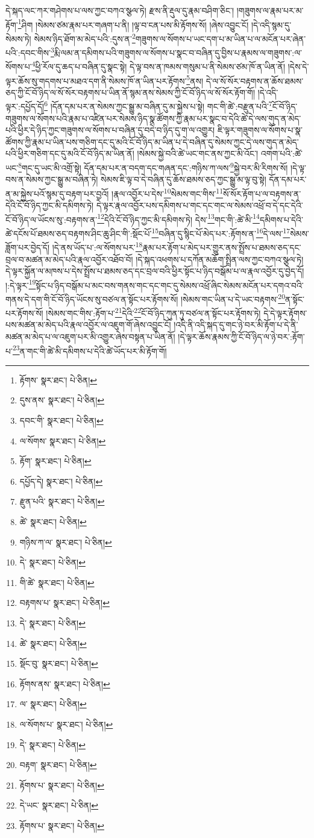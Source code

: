 དེ་སྐད་ལང་ཀར་གཤེགས་པ་ལས་ཀྱང་བཀའ་སྩལ་ཏེ། རྫས་ནི་རྡུལ་དུ་རྣམ་བཤིག་ཅིང་། །གཟུགས་ལ་རྣམ་པར་མ་རྟོག་\footnote{རྟོགས་  སྣར་ཐང་།  པེ་ཅིན། }ཤིག །སེམས་ཙམ་རྣམ་པར་གཞག་པ་ནི། །ལྟ་བ་ངན་པས་མི་རྟོགས་སོ། །ཞེས་འབྱུང་ངོ། །དེ་འདི་སྙམ་དུ་སེམས་ཏེ། སེམས་ཉིད་ཐོག་མ་མེད་པའི་:དུས་ན་\footnote{དུས་ནས་  སྣར་ཐང་།  པེ་ཅིན། }གཟུགས་ལ་སོགས་པ་ཡང་དག་པ་མ་ཡིན་པ་ལ་མངོན་པར་ཞེན་པའི་:དབང་གིས་\footnote{དབང་གི་  སྣར་ཐང་།  པེ་ཅིན། }རྨི་ལམ་ན་དམིགས་པའི་གཟུགས་ལ་སོགས་པ་སྣང་བ་བཞིན་དུ་བྱིས་པ་རྣམས་ལ་གཟུགས་:ལ་སོགས་པ་\footnote{ལ་སོགས་  སྣར་ཐང་།  པེ་ཅིན། }ཕྱི་རོལ་དུ་ཆད་པ་བཞིན་དུ་སྣང་སྟེ། དེ་ལྟ་བས་ན་ཁམས་གསུམ་པ་ནི་སེམས་ཙམ་ཁོ་ན་ཡིན་ནོ། །དེས་དེ་ལྟར་ཆོས་སུ་གདགས་པ་མཐའ་དག་ནི་སེམས་ཁོ་ན་ཡིན་པར་རྟོགས་\footnote{རྟོག་  སྣར་ཐང་།  པེ་ཅིན། }ནས། དེ་ལ་སོ་སོར་བརྟགས་ན་ཆོས་ཐམས་ཅད་ཀྱི་ངོ་བོ་ཉིད་ལ་སོ་སོར་བརྟགས་པ་ཡིན་ནོ་སྙམ་ནས་སེམས་ཀྱི་ངོ་བོ་ཉིད་ལ་སོ་སོར་རྟོག་གོ། །དེ་འདི་ལྟར་:དཔྱོད་དོ།\footnote{དཔྱོད་དེ།  སྣར་ཐང་།  པེ་ཅིན། } །དོན་དམ་པར་ན་སེམས་ཀྱང་སྒྱུ་མ་བཞིན་དུ་མ་སྐྱེས་པ་སྟེ། གང་གི་ཚེ་:བརྫུན་པའི་\footnote{རྫུན་པའི་  སྣར་ཐང་།  པེ་ཅིན། }ངོ་བོ་ཉིད་གཟུགས་ལ་སོགས་པའི་རྣམ་པ་འཛིན་པར་སེམས་ཉིད་སྣ་ཚོགས་ཀྱི་རྣམ་པར་སྣང་བ་དེའི་ཚེ་དེ་ལས་གུད་ན་མེད་པའི་ཕྱིར་དེ་ཉིད་ཀྱང་གཟུགས་ལ་སོགས་པ་བཞིན་དུ་བདེ་བ་ཉིད་དུ་ག་ལ་འགྱུར། ཇི་ལྟར་གཟུགས་ལ་སོགས་པ་སྣ་ཚོགས་ཀྱི་རྣམ་པ་ཡིན་པས་གཅིག་དང་དུ་མའི་ངོ་བོ་ཉིད་མ་ཡིན་པ་དེ་བཞིན་དུ་སེམས་ཀྱང་དེ་ལས་གུད་ན་མེད་པའི་ཕྱིར་གཅིག་དང་དུ་མའི་ངོ་བོ་ཉིད་མ་ཡིན་ནོ། །སེམས་སྐྱེ་བའི་ཚེ་ཡང་གང་ནས་ཀྱང་མི་འོང་། འགག་པའི་:ཚེ་ཡང་\footnote{ཚེ་  སྣར་ཐང་།  པེ་ཅིན། }གང་དུ་ཡང་མི་འགྲོ་སྟེ། དོན་དམ་པར་ན་བདག་དང་གཞན་དང་:གཉིས་ཀ་ལས་\footnote{གཉིས་ཀ་ལ་  སྣར་ཐང་།  པེ་ཅིན། }སྐྱེ་བར་མི་རིགས་སོ། །དེ་ལྟ་བས་ན་སེམས་ཀྱང་སྒྱུ་མ་བཞིན་ཏེ། སེམས་ཇི་ལྟ་བ་དེ་བཞིན་དུ་ཆོས་ཐམས་ཅད་ཀྱང་སྒྱུ་མ་ལྟ་བུ་སྟེ། དོན་དམ་པར་ན་མ་སྐྱེས་པའོ་སྙམ་དུ་བརྟག་པར་བྱའོ། །རྣལ་འབྱོར་པ་དེས་\footnote{དེ་  སྣར་ཐང་།  པེ་ཅིན། }སེམས་གང་གིས་\footnote{གི་ཚེ་  སྣར་ཐང་།  པེ་ཅིན། }སོ་སོར་རྟོག་པ་ལ་བརྟགས་ན་དེའི་ངོ་བོ་ཉིད་ཀྱང་མི་དམིགས་ཏེ། དེ་ལྟར་རྣལ་འབྱོར་པས་དམིགས་པ་གང་དང་གང་ལ་སེམས་འཕྲོ་བ་དེ་དང་དེའི་ངོ་བོ་ཉིད་ལ་ཡོངས་སུ་:བརྟགས་ན་\footnote{བརྟགས་པ་  སྣར་ཐང་།  པེ་ཅིན། }དེའི་ངོ་བོ་ཉིད་ཀྱང་མི་དམིགས་ཏེ། དེས་\footnote{དེ་  སྣར་ཐང་།  པེ་ཅིན། }གང་གི་:ཚེ་མི་\footnote{ཚེ་  སྣར་ཐང་།  པེ་ཅིན། }དམིགས་པ་དེའི་ཚེ་དངོས་པོ་ཐམས་ཅད་བརྟགས་ཤིང་ཆུ་ཤིང་གི་:སྡོང་པོ་\footnote{སྡོང་བུ་  སྣར་ཐང་།  པེ་ཅིན། }བཞིན་དུ་སྙིང་པོ་མེད་པར་:རྟོགས་ན་\footnote{རྟོགས་ནས་  སྣར་ཐང་།  པེ་ཅིན། }དེ་ལས་\footnote{ལ་  སྣར་ཐང་།  པེ་ཅིན། }སེམས་ཟློག་པར་བྱེད་དོ། །དེ་ནས་ཡོད་པ་:ལ་སོགས་པར་\footnote{ལ་སོགས་པ་  སྣར་ཐང་།  པེ་ཅིན། }རྣམ་པར་རྟོག་པ་མེད་པར་གྱུར་ནས་སྤྲོས་པ་ཐམས་ཅད་དང་བྲལ་བ་མཚན་མ་མེད་པའི་རྣལ་འབྱོར་འཐོབ་བོ། །དེ་སྐད་འཕགས་པ་དཀོན་མཆོག་སྤྲིན་ལས་ཀྱང་བཀའ་སྩལ་ཏེ། དེ་ལྟར་སྐྱོན་ལ་མཁས་པ་དེས་སྤྲོས་པ་ཐམས་ཅད་དང་བྲལ་བའི་ཕྱིར་སྟོང་པ་ཉིད་བསྒོམ་པ་ལ་རྣལ་འབྱོར་དུ་བྱེད་དོ། །:དེ་ལྟར་\footnote{དེ་  སྣར་ཐང་།  པེ་ཅིན། }སྟོང་པ་ཉིད་བསྒོམ་པ་མང་བས་གནས་གང་དང་གང་དུ་སེམས་འཕྲོ་ཞིང་སེམས་མངོན་པར་དགའ་བའི་གནས་དེ་དག་གི་ངོ་བོ་ཉིད་ཡོངས་སུ་བཙལ་ན་སྟོང་པར་རྟོགས་སོ། །སེམས་གང་ཡིན་པ་དེ་ཡང་བརྟགས་\footnote{བརྟག་  སྣར་ཐང་།  པེ་ཅིན། }ན་སྟོང་པར་རྟོགས་སོ། །སེམས་གང་གིས་:རྟོག་པ་\footnote{རྟོགས་པ་  སྣར་ཐང་།  པེ་ཅིན། }དེའི་\footnote{དེ་ཡང་  སྣར་ཐང་།  པེ་ཅིན། }ངོ་བོ་ཉིད་ཀུན་ཏུ་བཙལ་ན་སྟོང་པར་རྟོགས་ཏེ། དེ་དེ་ལྟར་རྟོགས་པས་མཚན་མ་མེད་པའི་རྣལ་འབྱོར་ལ་འཇུག་གོ་ཞེས་འབྱུང་ངོ། །འདི་ནི་འདི་སྐད་དུ་གང་ཉེ་བར་མི་རྟོག་པ་དེ་ནི་མཚན་མ་མེད་པ་ལ་འཇུག་པར་མི་འགྱུར་ཞེས་བསྟན་པ་ཡིན་ནོ། །དེ་ལྟར་ཆོས་རྣམས་ཀྱི་ངོ་བོ་ཉིད་ལ་ཉེ་བར་:རྟོག་པ་\footnote{རྟོགས་པ་  སྣར་ཐང་།  པེ་ཅིན། }ན་གང་གི་ཚེ་མི་དམིགས་པ་དེའི་ཚེ་ཡོད་པར་མི་རྟོག་གོ། 